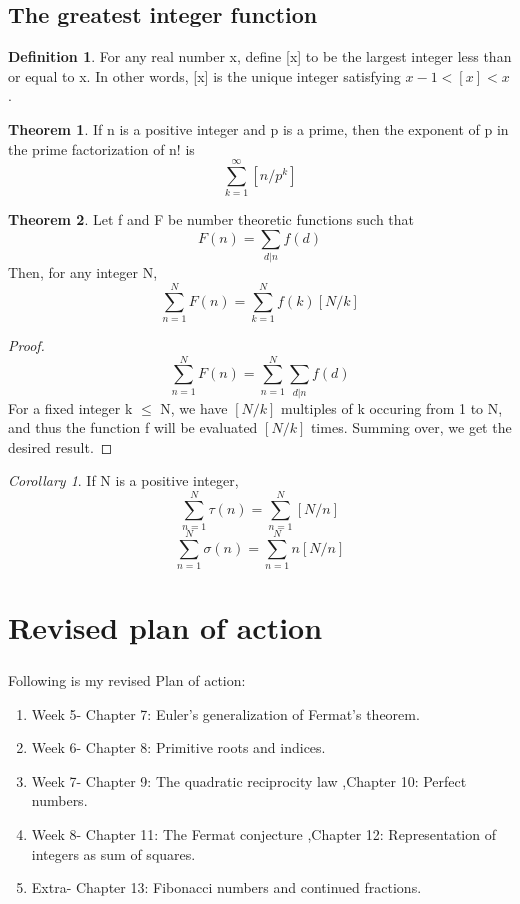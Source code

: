 \documentclass[15,a4paper]{report}
\theoremstyle{definition}
\newtheorem{definition}{Definition}[section]
\newtheorem{theorem}{Theorem}[section]
\theoremstyle{remark}
\newtheorem{corollary}{Corollary}[theorem]
\begin{document}
    \section{The greatest integer function}
        \begin{definition}
            For any real number x, define [x] to be the largest integer less than or equal to x. In other words, [x] is the unique integer satisfying $x-1<[x]<x$.
        \end{definition}
        \begin{theorem}
            If n is a positive integer and p is a prime, then the exponent of p in the prime factorization of n! is \[ \sum_{k=1}^{\infty} [n/p^k]\]
        \end{theorem}
        \begin{theorem}
            Let f and F be number theoretic functions such that
            \[ F(n) = \sum_{d|n} f(d) \]
            Then, for any integer N,
            \[ \sum_{n=1}^{N} F(n) = \sum_{k=1}^{N} f(k)[N/k] \]
        \end{theorem}
            \begin{proof}
                \[\sum_{n=1}^{N} F(n) = \sum_{n=1}^{N} \sum_{d|n} f(d) \]
                For a fixed integer k $\leq$ N, we have $[N/k]$ multiples of k occuring from 1 to N, and thus the function f will be evaluated  $[N/k]$ times. Summing over, we get the desired result.
            \end{proof}
            \begin{corollary}
                If N is a positive integer,
                \[ \sum_{n=1}^{N} \tau(n) = \sum_{n=1}^{N}[N/n] \]
                \[ \sum_{n=1}^{N} \sigma(n) = \sum_{n=1}^{N} n[N/n] \]
            \end{corollary}


\chapter*{Revised plan of action}
  \paragraph{} Following is my revised Plan of action:
  \begin{enumerate}
        \item Week 5- Chapter 7: Euler’s generalization of Fermat’s theorem.
        \item Week 6- Chapter 8: Primitive roots and indices.
        \item Week 7- Chapter 9: The quadratic reciprocity law ,Chapter 10: Perfect numbers.
        \item Week 8- Chapter 11: The Fermat conjecture ,Chapter 12: Representation of integers as sum of squares.
        \item Extra- Chapter 13: Fibonacci numbers and continued fractions.
  \end{enumerate}
\end{document}
